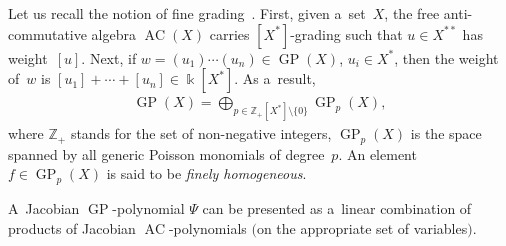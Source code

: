 \documentclass[pdftex]{sigma}
\begin{document}
Let us recall the notion of f\/ine grading~\cite{FarkasI}.
First, given a~set~$X$, the free anti-commutative algebra $\operatorname{AC}(X)$ carries $[X^*]$-grading such that $u\in X^{**}$ has weight~$[u]$.
Next, if $w = (u_1)\cdots (u_n)\in \operatorname{GP}(X)$, $u_i\in X^{*}$, then the weight of~$w$ is $[u_1]+\cdots + [u_n]\in \Bbbk [X^*]$.
As a~result,
\begin{gather*}
\operatorname{GP}(X) = \bigoplus\limits_{p\in \mathbb Z_+ [X^*]\setminus \{0\}} \operatorname{GP}_p(X),
\end{gather*}
where $\mathbb Z_+$ stands for the set of non-negative integers, $\operatorname{GP}_p(X)$ is the space spanned by all generic Poisson
monomials of degree~$p$.
An element $f\in \operatorname{GP}_p(X)$ is said to be {\em finely homogeneous}.

\begin{proposition}
A~Jacobian $\operatorname{GP}$-polynomial $\Psi $ can be presented as a~linear combination of products of Jacobian $\operatorname{AC}$-polynomials $($on the
appropriate set of variables$)$.
\end{proposition}
\end{document}
